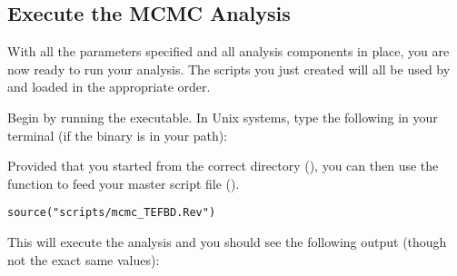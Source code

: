 \bigskip
\subsection{Execute the MCMC Analysis}\label{subsect:Exercise-RunMCMC}

With all the parameters specified and all analysis components in place, you are now ready to run your analysis. 
The \Rev scripts you just created will all be used by \RevBayes and loaded in the appropriate order.

{\begin{framed}
Begin by running the \RevBayes executable. In Unix systems, type the following in your terminal (if the \RevBayes binary is in your path):

\colorbox{black}{\strut\hspace{1mm}\textcolor[rgb]{0,1,1}{}\hspace{0.925\textwidth}}
\end{framed}}

Provided that you started \RevBayes from the correct directory (), you can then use the  function to feed \RevBayes your master script file ().
{\tt \begin{snugshade*}
\begin{lstlisting}
source("scripts/mcmc_TEFBD.Rev")
\end{lstlisting}
\end{snugshade*}}

This will execute the analysis and you should see the following output (though not the exact same values):

